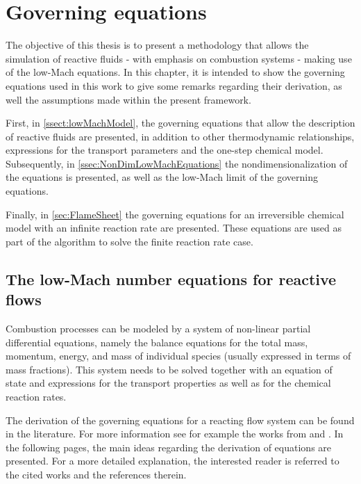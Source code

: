 \chapter{Governing equations}	\label{ch:gov_eqs}
The objective of this thesis is to present a methodology that allows the simulation of reactive fluids - with emphasis on combustion systems - making use of the low-Mach equations.  In this chapter, it is intended to show the governing equations used in this work to give some remarks regarding their derivation, as well the assumptions made within the present framework.

First, in \cref{ssect:lowMachModel}, the governing equations that allow the description of reactive fluids are presented, in addition to other thermodynamic relationships, expressions for the transport parameters and the one-step chemical model. Subsequently, in \cref{ssec:NonDimLowMachEquations} the nondimensionalization of the equations is presented, as well as the low-Mach limit of the governing equations.

Finally, in \cref{sec:FlameSheet} the governing equations for an irreversible chemical model with an infinite reaction rate are presented. These equations are used as part of the algorithm to solve the finite reaction rate case.



\section{The low-Mach number equations for reactive flows} \label{sec:GovEqLowMach}
Combustion processes can be modeled by a system of non-linear partial differential equations, namely the balance equations for the total mass, momentum, energy, and mass of individual species (usually expressed in terms of mass fractions). This system needs to be solved together with an equation of state and expressions for the transport properties as well as for the chemical reaction rates.

The derivation of the governing equations for a reacting flow system can be found in the literature. For more information see for example the works from \textcite{keeChemicallyReactingFlow2003} and \textcite{poinsotTheoreticalNumericalCombustion2005}. In the following pages, the main ideas regarding the derivation of equations are presented. For a more detailed explanation,  the interested reader is referred to the cited works and the references therein.

